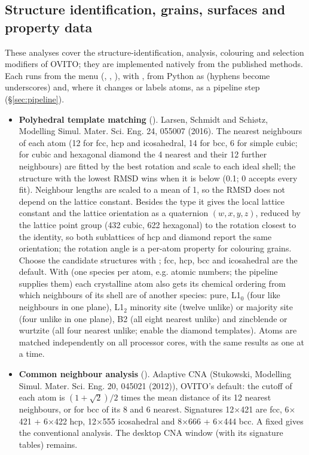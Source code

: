 \subsection{Structure identification, grains, surfaces and property data}\label{sec:ovito-tools}
These analyses cover the structure-identification, analysis, colouring and selection modifiers of OVITO; they are implemented natively from the published methods. Each runs from the  menu (, , ), with , from Python as  (hyphens become underscores) and, where it changes or labels atoms, as a pipeline step (\S\ref{sec:pipeline}).
\begin{itemize}
\item \textbf{Polyhedral template matching} (). Larsen, Schmidt and Schi\o{}tz, Modelling Simul. Mater. Sci. Eng. 24, 055007 (2016). The nearest neighbours of each atom (12 for fcc, hcp and icosahedral, 14 for bcc, 6 for simple cubic; for cubic and hexagonal diamond the 4 nearest and their 12 further neighbours) are fitted by the best rotation and scale to each ideal shell; the structure with the lowest RMSD wins when it is below  (0.1; 0 accepts every fit). Neighbour lengths are scaled to a mean of 1, so the RMSD does not depend on the lattice constant. Besides the type it gives the local lattice constant and the lattice orientation as a quaternion $(w,x,y,z)$, reduced by the lattice point group (432 cubic, 622 hexagonal) to the rotation closest to the identity, so both sublattices of hcp and diamond report the same orientation; the rotation angle is a per-atom property for colouring grains. Choose the candidate structures with ; fcc, hcp, bcc and icosahedral are the default. With  (one species per atom, e.g. atomic numbers; the pipeline supplies them) each crystalline atom also gets its chemical ordering from which neighbours of its shell are of another species: pure, L1$_0$ (four like neighbours in one plane), L1$_2$ minority site (twelve unlike) or majority site (four unlike in one plane), B2 (all eight nearest unlike) and zincblende or wurtzite (all four nearest unlike; enable the diamond templates). Atoms are matched independently on all processor cores, with the same results as one at a time.
\item \textbf{Common neighbour analysis} (). Adaptive CNA (Stukowski, Modelling Simul. Mater. Sci. Eng. 20, 045021 (2012)), OVITO's default: the cutoff of each atom is $(1+\sqrt2)/2$ times the mean distance of its 12 nearest neighbours, or for bcc of its 8 and 6 nearest. Signatures 12$\times$421 are fcc, 6$\times$421 + 6$\times$422 hcp, 12$\times$555 icosahedral and 8$\times$666 + 6$\times$444 bcc. A fixed  gives the conventional analysis. The desktop CNA window (with its signature tables) remains.

\end{itemize}
